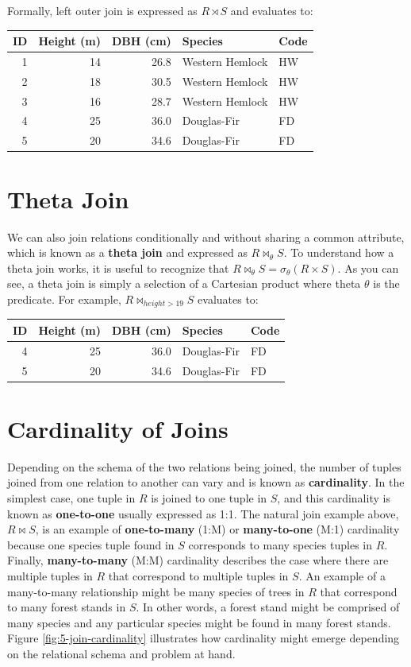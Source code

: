 \documentclass[
]{book}
\begin{document}
Formally, left outer join is expressed as \(R⋊S\) and evaluates to:

\begin{tabular}{rrrll}
\toprule
ID & Height (m) & DBH (cm) & Species & Code\\
\midrule
1 & 14 & 26.8 & Western Hemlock & HW\\
2 & 18 & 30.5 & Western Hemlock & HW\\
3 & 16 & 28.7 & Western Hemlock & HW\\
4 & 25 & 36.0 & Douglas-Fir & FD\\
5 & 20 & 34.6 & Douglas-Fir & FD\\
\bottomrule
\end{tabular}

\section{Theta Join}\label{theta-join}

We can also join relations conditionally and without sharing a common attribute, which is known as a \textbf{theta join} and expressed as \(R⋈_θS\). To understand how a theta join works, it is useful to recognize that \(R⋈_θS=σ_{θ}(R×S)\). As you can see, a theta join is simply a selection of a Cartesian product where theta \(θ\) is the predicate. For example, \(R⋈_{height>19}S\) evaluates to:

\begin{tabular}{rrrll}
\toprule
ID & Height (m) & DBH (cm) & Species & Code\\
\midrule
4 & 25 & 36.0 & Douglas-Fir & FD\\
5 & 20 & 34.6 & Douglas-Fir & FD\\
\bottomrule
\end{tabular}

\section{Cardinality of Joins}\label{cardinality-of-joins}

Depending on the schema of the two relations being joined, the number of tuples joined from one relation to another can vary and is known as \textbf{cardinality}. In the simplest case, one tuple in \(R\) is joined to one tuple in \(S\), and this cardinality is known as \textbf{one-to-one} usually expressed as 1:1. The natural join example above, \(R⋈S\), is an example of \textbf{one-to-many} (1:M) or \textbf{many-to-one} (M:1) cardinality because one species tuple found in \(S\) corresponds to many species tuples in \(R\). Finally, \textbf{many-to-many} (M:M) cardinality describes the case where there are multiple tuples in \(R\) that correspond to multiple tuples in \(S\). An example of a many-to-many relationship might be many species of trees in \(R\) that correspond to many forest stands in \(S\). In other words, a forest stand might be comprised of many species and any particular species might be found in many forest stands. Figure \ref{fig:5-join-cardinality} illustrates how cardinality might emerge depending on the relational schema and problem at hand.
\end{document}
